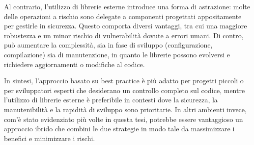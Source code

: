Al contrario, l'utilizzo di librerie esterne introduce una forma di astrazione: molte
delle operazioni a rischio sono delegate a componenti progettati appositamente per
gestirle in sicurezza. Questo comporta diversi vantaggi, tra cui una maggiore robustezza
e un minor rischio di vulnerabilità dovute a errori umani. Di contro, può aumentare
la complessità, sia in fase di sviluppo (configurazione, compilazione) sia di manutenzione,
in quanto le librerie possono evolversi e richiedere aggiornamenti o modifiche
al codice.

In sintesi, l'approccio basato su best practice è più adatto per progetti piccoli
o per sviluppatori esperti che desiderano un controllo completo sul codice,
mentre l'utilizzo di librerie esterne è preferibile in contesti dove la
sicurezza, la manutenibilità e la rapidità di sviluppo sono prioritarie. In
altri ambienti invece, com'è stato evidenziato più volte in questa tesi,
potrebbe essere vantaggioso un approccio ibrido che combini le due strategie in
modo tale da massimizzare i benefici e minimizzare i rischi.